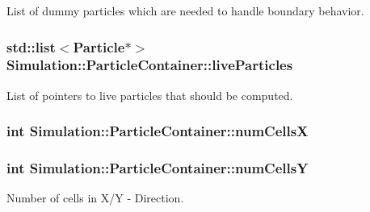 List of dummy particles which are needed to handle boundary behavior. 

\hypertarget{classSimulation_1_1ParticleContainer_a851707b9ea1f91a934e7eda5e219b97d}{
\subsubsection[{live\-Particles}]{\setlength{\rightskip}{0pt plus 5cm}std\-::list$<${\bf Particle}$\ast$$>$ Simulation\-::\-Particle\-Container\-::live\-Particles\hspace{0.3cm}{\ttfamily [private]}}}\label{classSimulation_1_1ParticleContainer_a851707b9ea1f91a934e7eda5e219b97d}


List of pointers to live particles that should be computed. 

\hypertarget{classSimulation_1_1ParticleContainer_a26ff75d3f5c109fc354bb95e460bef20}{
\subsubsection[{num\-Cells\-X}]{\setlength{\rightskip}{0pt plus 5cm}int Simulation\-::\-Particle\-Container\-::num\-Cells\-X\hspace{0.3cm}{\ttfamily [private]}}}\label{classSimulation_1_1ParticleContainer_a26ff75d3f5c109fc354bb95e460bef20}
\hypertarget{classSimulation_1_1ParticleContainer_ae248a9742a4d62f0cc692214eef9ba63}{
\subsubsection[{num\-Cells\-Y}]{\setlength{\rightskip}{0pt plus 5cm}int Simulation\-::\-Particle\-Container\-::num\-Cells\-Y\hspace{0.3cm}{\ttfamily [private]}}}\label{classSimulation_1_1ParticleContainer_ae248a9742a4d62f0cc692214eef9ba63}


Number of cells in X/\-Y -\/ Direction. 

